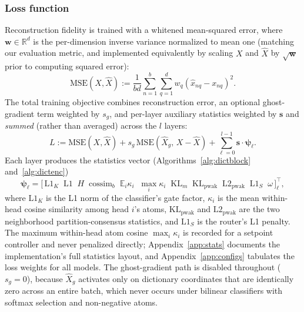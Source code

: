 \subsubsection{Loss function}
\label{sec:loss}
Reconstruction fidelity is trained with a whitened mean-squared error,
where $\mathbf{w} \in \mathbb{R}^d$ is the per-dimension inverse variance
normalized to mean one (matching our evaluation metric, and implemented
equivalently by scaling $X$ and $\hat{X}$ by $\sqrt{\mathbf{w}}$ prior to
computing squared error):
\begin{equation}
	\mathrm{MSE}(X,\hat{X}) := \frac{1}{bd}\sum^{b}_{n=1}\sum^{d}_{q=1}
	w_q\left(\hat{x}_{nq} - x_{nq}\right)^2.
	\label{eq:mse}
\end{equation}
The total training objective combines reconstruction error, an optional
ghost-gradient term weighted by $s_g$, and per-layer auxiliary statistics
weighted by $\mathbf{s}$ and \emph{summed} (rather than averaged) across
the $l$ layers:
\begin{equation}
	L := \mathrm{MSE}(X,\hat{X})
	+ s_g\,\mathrm{MSE}(\hat{X}_g,\, X - \hat{X})
	+ \sum^{l-1}_{\ell=0}\mathbf{s}\cdot\boldsymbol{\psi}_\ell.
	\label{eq:loss_total}
\end{equation}
Each layer produces the statistics vector (Algorithms~\ref{alg:dictblock}
and~\ref{alg:dictenc})
\begin{equation}
	\boldsymbol{\psi}_\ell = \big[\,
	\mathrm{L1}_K \;\; \mathrm{L1} \;\; H \;\; \mathrm{cossim}_b \;\;
	\mathbb{E}_i\kappa_i \;\; \max_i \kappa_i \;\;
	\mathrm{KL}_m \;\; \mathrm{KL}_{\mathrm{pwak}} \;\; \mathrm{L2}_{\mathrm{pwak}}
	\;\; \mathrm{L1}_S \;\; \omega
	\,\big]^{\top}_\ell,
	\label{eq:stats}
\end{equation}
where $\mathrm{L1}_K$ is the L1 norm of the classifier's gate
factor, $\kappa_i$ is the mean within-head cosine similarity among head
$i$'s atoms, $\mathrm{KL}_{\mathrm{pwak}}$ and
$\mathrm{L2}_{\mathrm{pwak}}$ are the two neighborhood
partition-consensus statistics, and $\mathrm{L1}_S$ is the router's
L1 penalty. The maximum within-head atom cosine $\max_i \kappa_i$
is recorded for a setpoint controller and never penalized directly;
Appendix~\ref{app:stats} documents the implementation's full statistics
layout, and Appendix~\ref{app:configs} tabulates the loss weights for all
models. The ghost-gradient path is disabled throughout ($s_g = 0$),
because $\hat{X}_g$ activates only on dictionary coordinates that are
identically zero across an entire batch, which never occurs under
bilinear classifiers with softmax selection and non-negative atoms.

